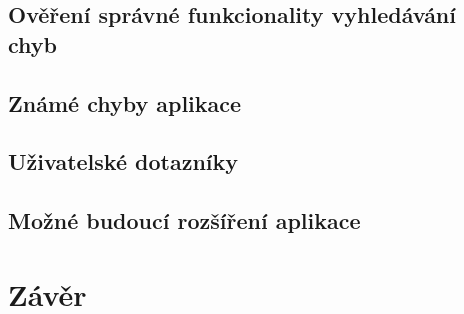 \section{Ověření správné funkcionality vyhledávání chyb}


\section{Známé chyby aplikace}


\section{Uživatelské dotazníky}


\section{Možné budoucí rozšíření aplikace}





\chapter{Závěr}

\dummyShortText[8]

\dummyText[2]





%
